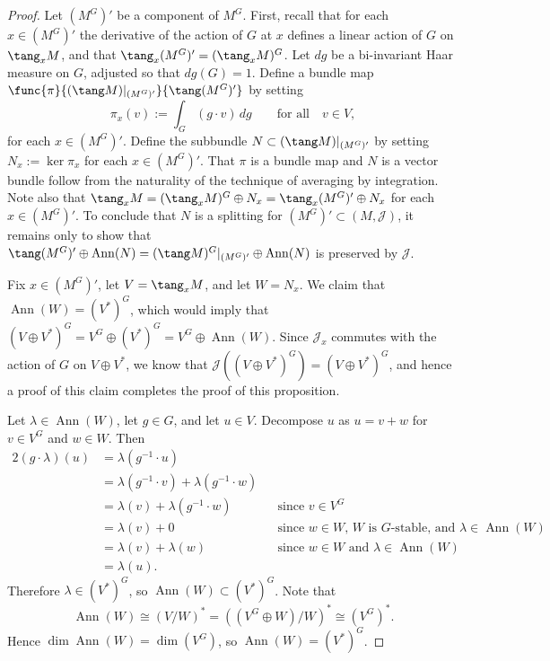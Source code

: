 \begin{proof}
Let $(M^G)'$ be a component of $M^G$.
First, recall that for each $x \in (M^G)'$ the derivative of the action of $G$ at $x$ def\/ines a linear action of $G$ on $\tang_x M$, and that $\tang_x (M^G)' = (\tang_x M)^G$.  Let $dg$ be a bi-invariant Haar measure on $G$, adjusted so that $dg(G) = 1$.  Def\/ine a bundle map $\func{\pi}{(\tang M)|_{(M^G)'}}{\tang (M^G)'}$ by setting
\[
  \pi_x(v) := \int_G (g \cdot v) \, dg
  \qquad
  \text{for all} \quad v \in V,
\]
for each $x \in (M^G)'$.  Def\/ine the subbundle $N \subset (\tang M)|_{(M^G)'}$ by setting $N_x := \ker \pi_x$ for each $x \in \left( M^G \right)'$.  That $\pi$ is a bundle map and $N$ is a vector bundle follow from the naturality of the technique of averaging by integration.  Note also that $\tang_x M = (\tang_x M)^G \oplus N_x = \tang_x (M^G)' \oplus N_x$ for each $x \in \left( M^G \right)'$.  To conclude that $N$ is a splitting for $(M^G)' \subset (M,\mathcal{J})$, it remains only to show that $\tang (M^G)' \oplus \operatorname{Ann}(N) = (\tang M)^G|_{(M^G)'} \oplus \operatorname{Ann}(N)$ is preserved by $\mathcal{J}$.

Fix $x \in \left( M^G \right)'$, let $V = \tang_x M$, and let $W = N_x$.  We claim that $\operatorname{Ann}(W) = (V^*)^G$, which would imply that $(V \oplus V^*)^G = V^G \oplus (V^*)^G = V^G \oplus \operatorname{Ann}(W)$.  Since $\mathcal{J}_x$ commutes with the action of $G$ on $V \oplus V^*$, we know that $\mathcal{J} \left( (V \oplus V^*)^G \right) = (V \oplus V^*)^G$, and hence a proof of this claim completes the proof of this proposition.

Let $\lambda \in \operatorname{Ann}(W)$, let $g \in G$, and let $u \in V$.  Decompose $u$ as $u=v + w$ for $v \in V^G$ and $w \in W$.
Then
\begin{alignat*}{2}
  (g \cdot \lambda)(u)
  &=
  \lambda ( g^{-1} \cdot u)
  && \\
  &=
  \lambda ( g^{-1} \cdot v) + \lambda(g^{-1} \cdot w)
  && \\
  &=
  \lambda (v) + \lambda(g^{-1} \cdot w)
  && \text{since } v \in V^G \\
  &=
  \lambda (v) + 0
  && \text{since $w \in W$, $W$ is $G$-stable, and }
  \lambda \in \operatorname{Ann}(W) \\
  &=
  \lambda (v) + \lambda (w)
  && \text{since $w \in W$ and } \lambda \in \operatorname{Ann}(W) \\
  &=
  \lambda (u).
  &&
\end{alignat*}
Therefore $\lambda \in (V^*)^G$, so $\operatorname{Ann}(W) \subset (V^*)^G$.  Note that
\[
  \operatorname{Ann}(W)
  \cong
  (V / W)^*
  =
  \left( (V^G \oplus W) / W \right)^*
  \cong
  (V^G)^*.
\]
Hence $\dim \operatorname{Ann}(W) = \dim (V^G)$, so $\operatorname{Ann} (W) = (V^*)^G$.
\end{proof}




